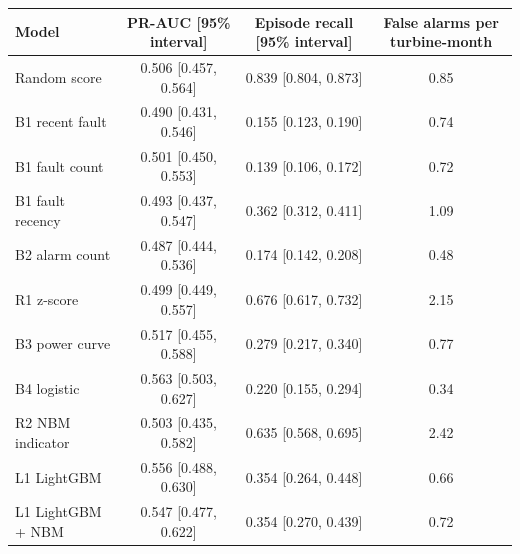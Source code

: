 \begin{tabular}{@{}lccc@{}}
\toprule
Model & PR-AUC [95\% interval] & Episode recall [95\% interval] & False alarms per turbine-month \\
\midrule
Random score & 0.506 [0.457, 0.564] & 0.839 [0.804, 0.873] & 0.85 \\
B1 recent fault & 0.490 [0.431, 0.546] & 0.155 [0.123, 0.190] & 0.74 \\
B1 fault count & 0.501 [0.450, 0.553] & 0.139 [0.106, 0.172] & 0.72 \\
B1 fault recency & 0.493 [0.437, 0.547] & 0.362 [0.312, 0.411] & 1.09 \\
B2 alarm count & 0.487 [0.444, 0.536] & 0.174 [0.142, 0.208] & 0.48 \\
R1 z-score & 0.499 [0.449, 0.557] & 0.676 [0.617, 0.732] & 2.15 \\
B3 power curve & 0.517 [0.455, 0.588] & 0.279 [0.217, 0.340] & 0.77 \\
B4 logistic & 0.563 [0.503, 0.627] & 0.220 [0.155, 0.294] & 0.34 \\
R2 NBM indicator & 0.503 [0.435, 0.582] & 0.635 [0.568, 0.695] & 2.42 \\
L1 LightGBM & 0.556 [0.488, 0.630] & 0.354 [0.264, 0.448] & 0.66 \\
L1 LightGBM + NBM & 0.547 [0.477, 0.622] & 0.354 [0.270, 0.439] & 0.72 \\
\bottomrule
\end{tabular}
